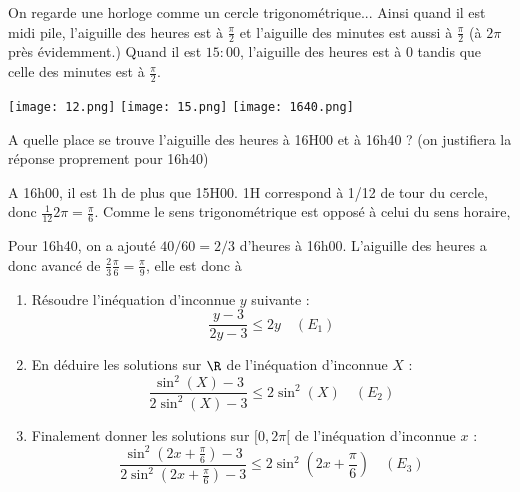 \documentclass[a4paper, 11pt,reqno]{article}
\begin{document}
\begin{exercice}
On regarde une horloge comme un cercle trigonométrique... Ainsi quand il est midi pile, l'aiguille des heures est à $\frac{\pi}{2}$ et l'aiguille des minutes est aussi à $\frac{\pi}{2}$ (à $2\pi$ près évidemment.) Quand il est $15:00$, l'aiguille des heures est à $0$ tandis que celle des minutes est à $\frac{\pi}{2}$. 

\begin{center}
\texttt{[image: 12.png]}
\texttt{[image: 15.png]}
\texttt{[image: 1640.png]}
\end{center}


A quelle place se trouve l'aiguille des heures à 16H00 et à 16h40 ? (on justifiera la réponse proprement pour 16h40) 
\end{exercice}
\begin{correction}
A 16h00, il est 1h de plus que 15H00. 1H correspond à 1/12 de tour du cercle, donc $\frac{1}{12}2\pi = \frac{\pi}{6}$. Comme le sens trigonométrique est opposé à celui du sens horaire,

Pour 16h40, on a ajouté $40/60=2/3$ d'heures à 16h00. L'aiguille des heures a donc avancé de $\frac{2}{3} \frac{\pi}{6} = \frac{\pi}{9}$, elle est donc à  


 

\end{correction}
\vspace{1cm}
\begin{exercice}
\begin{enumerate}
\item Résoudre l'inéquation d'inconnue $y$ suivante : 
$$\frac{y-3}{2y-3}\leq 2y \quad (E_1)$$

\item En déduire les solutions sur $\R$ de l'inéquation d'inconnue $X$  : 
$$\frac{\sin^2(X)-3}{2\sin^2(X) -3} \leq 2 \sin^2(X)\quad (E_2)$$

\item Finalement donner les solutions sur $[0,2\pi[ $ de l'inéquation d'inconnue $x$ : 
$$\frac{\sin^2(2x+\frac{\pi}{6})-3}{2\sin^2(2x+\frac{\pi}{6}) -3} \leq 2 \sin^2(2x+\frac{\pi}{6}) \quad (E_3)$$
\end{enumerate}

\end{exercice}
\end{document}
